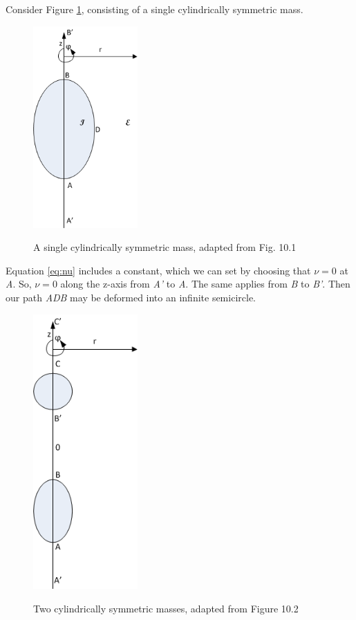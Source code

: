 \documentclass{article}
\begin{document}
Consider Figure \ref{fig:single-mass}, consisting of a single cylindrically symmetric mass.

\begin{figure}
\centering
\caption[A single cylindrically symmetric mass]
{A single cylindrically symmetric mass, adapted from \cite{synge_relativity} Fig. 10.1}
\includegraphics[width=40mm]{Figure1.png}
\label{fig:single-mass}
\end{figure}

Equation \eqref{eq:nu} includes a constant, which we can set by choosing that $\nu=0$ at \emph{A}. So, $\nu=0$ along the z-axis from \emph{A'} to \emph{A}. The same applies from \emph{B} to \emph{B'}. Then our path \emph{ADB} may be deformed into an infinite semicircle.



\begin{figure}
\centering
\caption[Two cylindrically symmetric masses]
{Two cylindrically symmetric masses, adapted from \cite{synge_relativity} Figure 10.2}
\includegraphics[width=40mm]{Figure2.png}
\label{fig:two-masses}
\end{figure}
\end{document}
